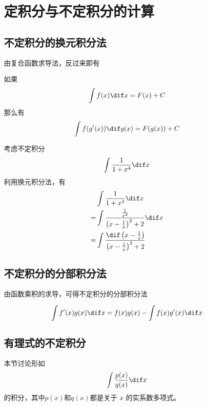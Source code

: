 
\section{定积分与不定积分的计算}
\label{sec:computation-of-definite-and-indefinite-integral}

\subsection{不定积分的换元积分法}
\label{sec:indefinite-integration-by-substitution}

由复合函数求导法，反过来即有
\begin{theorem}[不定积分的换元积分法]
    如果
    \[ \int f(x) \dif x = F(x)+C \]
    那么有
    \[ \int f(g'(x)) \dif g(x) = F(g(x)) + C \]
\end{theorem}

\begin{example}
    考虑不定积分
    \[ \int \frac{1}{1+x^4} \dif x \]
    利用换元积分法，有
    \begin{align*}
        & \int \frac{1}{1+x^4} \dif x \\
        = & \int \frac{\frac{1}{x^2}}{\left( x - \frac{1}{x} \right)^2+2} \dif x \\
        = & \int \frac{\dif \left( x - \frac{1}{x} \right)}{\left( x - \frac{1}{x} \right)^2+2}
    \end{align*}
\end{example}

\subsection{不定积分的分部积分法}
\label{sec:indefinite-integration-by-partial}
由函数乘积的求导，可得不定积分的分部积分法
\begin{theorem}
    \[ \int f'(x)g(x) \dif x = f(x)g(x) - \int f(x)g'(x) \dif x \]
\end{theorem}

\subsection{有理式的不定积分}
\label{sec:indefinite-integration-of-rational-function}

本节讨论形如
\[ \int \frac{p(x)}{q(x)} \dif x \]
的积分，其中$p(x)$和$q(x)$都是关于 $x$ 的实系数多项式。

